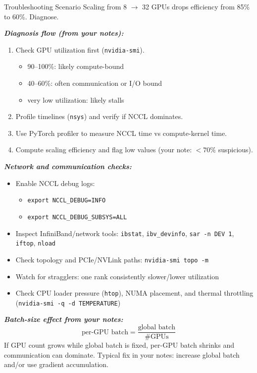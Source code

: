 \documentclass[12pt]{article}
\let\origtextbf\textbf
\renewcommand{\textbf}[1]{\origtextbf{\textit{#1}}}
\begin{document}
\begin{redbox}{Troubleshooting Scenario}
Scaling from 8 $\rightarrow$ 32 GPUs drops efficiency from 85\% to 60\%. Diagnose.

\textbf{Diagnosis flow (from your notes):}
\begin{enumerate}[leftmargin=1.3em]
\item Check GPU utilization first (\texttt{nvidia-smi}).
\begin{itemize}
\item 90--100\%: likely compute-bound
\item 40--60\%: often communication or I/O bound
\item very low utilization: likely stalls
\end{itemize}
\item Profile timelines (\texttt{nsys}) and verify if NCCL dominates.
\item Use PyTorch profiler to measure NCCL time vs compute-kernel time.
\item Compute scaling efficiency and flag low values (your note: \(<70\%\) suspicious).
\end{enumerate}

\textbf{Network and communication checks:}
\begin{itemize}
\item Enable NCCL debug logs:
\begin{itemize}
\item \texttt{export NCCL\_DEBUG=INFO}
\item \texttt{export NCCL\_DEBUG\_SUBSYS=ALL}
\end{itemize}
\item Inspect InfiniBand/network tools: \texttt{ibstat}, \texttt{ibv\_devinfo}, \texttt{sar -n DEV 1}, \texttt{iftop}, \texttt{nload}
\item Check topology and PCIe/NVLink paths: \texttt{nvidia-smi topo -m}
\item Watch for stragglers: one rank consistently slower/lower utilization
\item Check CPU loader pressure (\texttt{htop}), NUMA placement, and thermal throttling (\texttt{nvidia-smi -q -d TEMPERATURE})
\end{itemize}

\textbf{Batch-size effect from your notes:}
\[
\text{per-GPU batch} = \frac{\text{global batch}}{\text{\#GPUs}}
\]
If GPU count grows while global batch is fixed, per-GPU batch shrinks and communication can dominate.  
Typical fix in your notes: increase global batch and/or use gradient accumulation.


\end{redbox}
\end{document}
